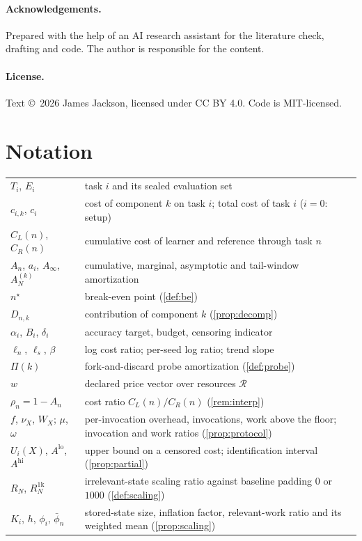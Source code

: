 \documentclass[11pt]{article}
\theoremstyle{remark}
\newcommand{\cR}{\mathcal{R}}
\begin{document}
\paragraph{Acknowledgements.}
Prepared with the help of an AI research assistant for the literature check, drafting and code. The author is responsible for the content.

\paragraph{License.}
Text \copyright\ 2026 James Jackson, licensed under CC BY 4.0. Code is MIT-licensed.




\appendix
\section{Notation}
\begin{tabularx}{\linewidth}{lX}
\toprule
$T_i$, $E_i$ & task $i$ and its sealed evaluation set\\
$c_{i,k}$, $c_i$ & cost of component $k$ on task $i$; total cost of task $i$ ($i=0$: setup)\\
$C_L(n)$, $C_R(n)$ & cumulative cost of learner and reference through task $n$\\
$A_n$, $a_i$, $A_\infty$, $A^{(k)}_N$ & cumulative, marginal, asymptotic and tail-window amortization\\
$n^\star$ & break-even point (\cref{def:be})\\
$D_{n,k}$ & contribution of component $k$ (\cref{prop:decomp})\\
$\alpha_i$, $B_i$, $\delta_i$ & accuracy target, budget, censoring indicator\\
$\ell_n$, $\ell_s$, $\beta$ & log cost ratio; per-seed log ratio; trend slope\\
$\Pi(k)$ & fork-and-discard probe amortization (\cref{def:probe})\\
$w$ & declared price vector over resources $\cR$\\
$\rho_n=1-A_n$ & cost ratio $C_L(n)/C_R(n)$ (\cref{rem:interp})\\
$f$, $\nu_X$, $W_X$; $\mu$, $\omega$ & per-invocation overhead, invocations, work above the floor; invocation and work ratios (\cref{prop:protocol})\\
$U_i(X)$, $A^{\mathrm{lo}}$, $A^{\mathrm{hi}}$ & upper bound on a censored cost; identification interval (\cref{prop:partial})\\
$R_N$, $R^{1\mathrm{k}}_N$ & irrelevant-state scaling ratio against baseline padding $0$ or $1000$ (\cref{def:scaling})\\
$K_i$, $h$, $\phi_i$, $\bar\phi_n$ & stored-state size, inflation factor, relevant-work ratio and its weighted mean (\cref{prop:scaling})\\
\bottomrule
\end{tabularx}
\end{document}
